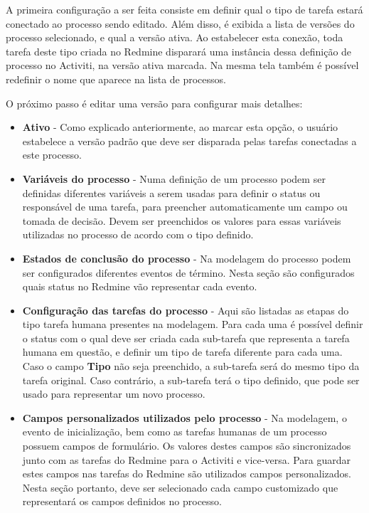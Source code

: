 A primeira configuração a ser feita consiste em definir qual o tipo de tarefa estará conectado ao processo sendo editado. Além disso, é exibida a lista de versões do processo selecionado, e qual a versão ativa. Ao estabelecer esta conexão, toda tarefa deste tipo criada no Redmine disparará uma instância dessa definição de processo no Activiti, na versão ativa marcada.
Na mesma tela também é possível redefinir o nome que aparece na lista de processos.

O próximo passo é editar uma versão para configurar mais detalhes:

\begin{itemize}
\item \textbf{Ativo} - Como explicado anteriormente, ao marcar esta opção, o usuário estabelece a versão padrão que deve ser disparada pelas tarefas conectadas a este processo.

\item \textbf{Variáveis do processo} - Numa definição de um processo podem ser definidas diferentes variáveis a serem usadas para definir o status ou responsável de uma tarefa, para preencher automaticamente um campo ou tomada de decisão. Devem ser preenchidos os valores para essas variáveis utilizadas no processo de acordo com o tipo definido.

\item \textbf{Estados de conclusão do processo} - 
Na modelagem do processo podem ser configurados diferentes eventos de término. Nesta seção são configurados quais status no Redmine vão representar cada evento.

\item \textbf{Configuração das tarefas do processo} - 
Aqui são listadas as etapas do tipo tarefa humana presentes na modelagem. Para cada uma é possível definir o status com o qual deve ser criada cada sub-tarefa que representa a tarefa humana em questão, e definir um tipo de tarefa diferente para cada uma. Caso o campo \textbf{Tipo} não seja preenchido, a sub-tarefa será do mesmo tipo da tarefa original. Caso contrário, a sub-tarefa terá o tipo definido, que pode ser usado para representar um novo processo.

\item \textbf{Campos personalizados utilizados pelo processo} - Na modelagem, o evento de inicialização, bem como as tarefas humanas de um processo possuem campos de formulário. Os valores destes campos são sincronizados junto com as tarefas do Redmine para o Activiti e vice-versa. Para guardar estes campos nas tarefas do Redmine são utilizados campos personalizados. Nesta seção portanto, deve ser selecionado cada campo customizado que representará os campos definidos no processo.

\end{itemize}

